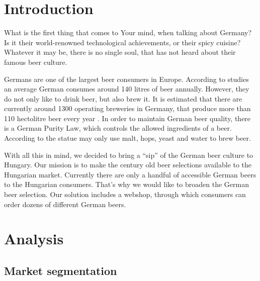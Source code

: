 

\newcommand\Title{Group Assignment}
\newcommand\Date{\today}
\newcommand\Name{Ádám Kohajda \\ Dániel Nagy \\ József Szenka \\ László Kocsis \\ Zoltán Hafner}
\newcommand\Course{Marketing}
\newcommand\Neptun{BMEGT20MW01}
\newcommand\CourseNeptun{BMEGT20MW01}






\section{Introduction}
What is the first thing that comes to Your mind, when talking about Germany? Is it their world-renowned technological achievements, or their spicy cuisine? Whatever it may be, there is no single soul, that has not heard about their famous beer culture.

Germans are one of the largest beer consumers in Europe. According to studies an average German consumes around 140 litres of beer annually. However, they do not only like to drink beer, but also brew it. It is estimated that there are currently around 1300 operating breweries in Germany, that produce more than 110 hectolitre beer every year \cite{statista1}. In order to maintain German beer quality, there is a German Purity Law, which controls the allowed ingredients of a beer. According to the statue may only use malt, hops, yeast and water to brew beer.

With all this in mind, we decided to bring a “sip” of the German beer culture to Hungary. Our mission is to make the century old beer selections available to the Hungarian market. Currently there are only a handful of accessible German beers to the Hungarian consumers. That’s why we would like to broaden the German beer selection. Our solution includes a webshop, through which consumers can order dozens of different German beers.

\section{Analysis}
\subsection{Market segmentation}

